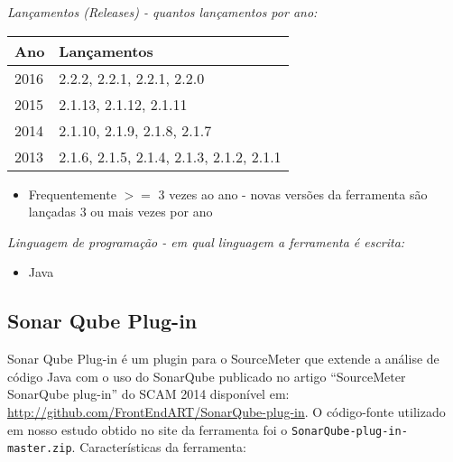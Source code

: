 \begin{description}

  \item {\it Lançamentos ({\it Releases}) - quantos lançamentos por ano:}
    \begin{table}[h!]
      \centering
      \begin{tabular}{| l | l |}
        \hline
        Ano  & Lançamentos                              \\
        \hline
        2016 & 2.2.2, 2.2.1, 2.2.1, 2.2.0               \\
        2015 & 2.1.13, 2.1.12, 2.1.11                   \\
        2014 & 2.1.10, 2.1.9, 2.1.8, 2.1.7              \\
        2013 & 2.1.6, 2.1.5, 2.1.4, 2.1.3, 2.1.2, 2.1.1 \\
        \hline
      \end{tabular}
    \end{table}
    \begin{itemize}
      \item Frequentemente $>=$ 3 vezes ao ano - novas versões da ferramenta são lançadas 3 ou mais vezes por ano
    \end{itemize}

  \item {\it Linguagem de programação - em qual linguagem a ferramenta é escrita:}
    \begin{itemize}
      \item Java
    \end{itemize}

\end{description}

\subsection{Sonar Qube Plug-in}

Sonar Qube Plug-in é um plugin para o SourceMeter que extende a análise de
código Java com o uso do SonarQube publicado no artigo ``SourceMeter SonarQube
plug-in'' do SCAM 2014 disponível em:
\url{http://github.com/FrontEndART/SonarQube-plug-in}. O código-fonte
utilizado em nosso estudo obtido no site da ferramenta foi o
\texttt{SonarQube-plug-in-master.zip}. Características da ferramenta:

